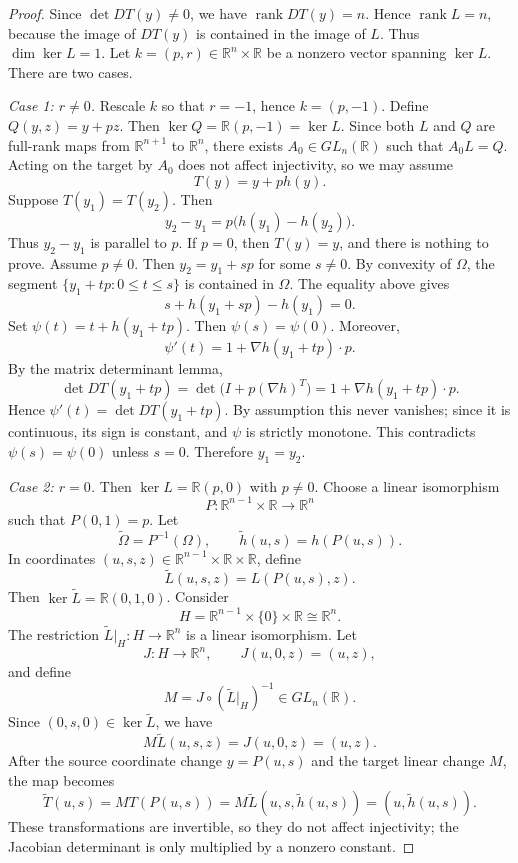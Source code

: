 \documentclass[a4paper,11pt]{article}
\theoremstyle{plain}
\theoremstyle{definition}
\theoremstyle{remark}
\DeclareMathOperator{\rank}{rank}
\begin{document}
\begin{proof}
Since \(\det DT(y)\ne0\), we have \(\rank DT(y)=n\). Hence \(\rank L=n\), because the image of \(DT(y)\) is contained in the image of \(L\). Thus \(\dim\ker L=1\). Let \(k=(p,r)\in\mathbb R^n\times\mathbb R\) be a nonzero vector spanning \(\ker L\). There are two cases.

\emph{Case 1: \(r\ne0\).} Rescale \(k\) so that \(r=-1\), hence \(k=(p,-1)\). Define \(Q(y,z)=y+pz\). Then \(\ker Q=\mathbb R(p,-1)=\ker L\). Since both \(L\) and \(Q\) are full-rank maps from \(\mathbb R^{n+1}\) to \(\mathbb R^n\), there exists \(A_0\in GL_n(\mathbb R)\) such that \(A_0L=Q\). Acting on the target by \(A_0\) does not affect injectivity, so we may assume
\[
T(y)=y+p h(y).
\]
Suppose \(T(y_1)=T(y_2)\). Then
\[
y_2-y_1=p\bigl(h(y_1)-h(y_2)\bigr).
\]
Thus \(y_2-y_1\) is parallel to \(p\). If \(p=0\), then \(T(y)=y\), and there is nothing to prove. Assume \(p\ne0\). Then \(y_2=y_1+sp\) for some \(s\ne0\). By convexity of \(\Omega\), the segment \(\{y_1+tp:0\le t\le s\}\) is contained in \(\Omega\). The equality above gives
\[
s+h(y_1+sp)-h(y_1)=0.
\]
Set \(\psi(t)=t+h(y_1+tp)\). Then \(\psi(s)=\psi(0)\). Moreover,
\[
\psi'(t)=1+\nabla h(y_1+tp)\cdot p.
\]
By the matrix determinant lemma,
\[
\det DT(y_1+tp)=\det\bigl(I+p(\nabla h)^T\bigr)=1+\nabla h(y_1+tp)\cdot p.
\]
Hence \(\psi'(t)=\det DT(y_1+tp)\). By assumption this never vanishes; since it is continuous, its sign is constant, and \(\psi\) is strictly monotone. This contradicts \(\psi(s)=\psi(0)\) unless \(s=0\). Therefore \(y_1=y_2\).

\emph{Case 2: \(r=0\).} Then \(\ker L=\mathbb R(p,0)\) with \(p\ne0\). Choose a linear isomorphism
\[
P:\mathbb R^{n-1}\times\mathbb R\to\mathbb R^n
\]
such that \(P(0,1)=p\). Let
\[
\widetilde\Omega=P^{-1}(\Omega),\qquad \widetilde h(u,s)=h(P(u,s)).
\]
In coordinates \((u,s,z)\in\mathbb R^{n-1}\times\mathbb R\times\mathbb R\), define
\[
\widetilde L(u,s,z)=L(P(u,s),z).
\]
Then \(\ker\widetilde L=\mathbb R(0,1,0)\). Consider
\[
H=\mathbb R^{n-1}\times\{0\}\times\mathbb R\cong\mathbb R^n.
\]
The restriction \(\widetilde L|_H:H\to\mathbb R^n\) is a linear isomorphism. Let
\[
J:H\to\mathbb R^n,
\qquad J(u,0,z)=(u,z),
\]
and define
\[
M=J\circ(\widetilde L|_H)^{-1}\in GL_n(\mathbb R).
\]
Since \((0,s,0)\in\ker\widetilde L\), we have
\[
M\widetilde L(u,s,z)=J(u,0,z)=(u,z).
\]
After the source coordinate change \(y=P(u,s)\) and the target linear change \(M\), the map becomes
\[
\widetilde T(u,s)=M T(P(u,s))=M\widetilde L(u,s,\widetilde h(u,s))=(u,\widetilde h(u,s)).
\]
These transformations are invertible, so they do not affect injectivity; the Jacobian determinant is only multiplied by a nonzero constant.


\end{proof}
\end{document}
